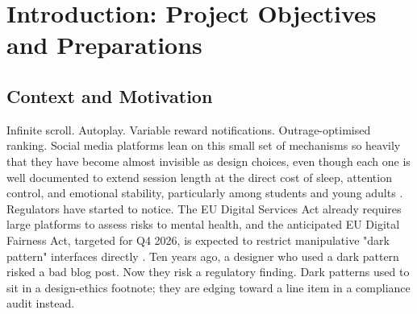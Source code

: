 \documentclass[11pt]{article}
\begin{document}
\clearpage
{}
\setcounter{page}{1}

\begin{abstract}
This project report documents the Stanford d.School design thinking process used to develop MindfulFeed, a pro-social social media application designed to replace engagement-maximising dark patterns with intentional, autonomy-preserving controls. Following the five sequential phases Empathize, Define, Ideate, Prototype, and Test, the project team conducted three semi-structured user interviews, synthesised an empathy map and a primary persona, framed a point-of-view statement and four How-Might-We questions, generated concepts through SCAMPER and a Desirability-Feasibility-Profitability matrix, and produced three progressively refined prototypes (low-, mid-, and high-fidelity) that were evaluated through cognitive walkthroughs and usability feedback. The resulting record traces concrete design decisions, such as symmetric opt-in/opt-out consent, tiered personalisation, and fatigue-aware nudges, back to specific user evidence and to the regulatory and behavioural-economics literature that framed the problem. A GenAI usage appendix discloses where generative AI tools assisted the project team.
\end{abstract}

\section{Introduction: Project Objectives and Preparations}

\subsection{Context and Motivation}
\label{sec:context_motivation}
Infinite scroll. Autoplay. Variable reward notifications. Outrage-optimised ranking. Social media platforms lean on this small set of mechanisms so heavily that they have become almost invisible as design choices, even though each one is well documented to extend session length at the direct cost of sleep, attention control, and emotional stability, particularly among students and young adults \parencites[11]{6644697}[6]{9300898}. Regulators have started to notice. The EU Digital Services Act already requires large platforms to assess risks to mental health, and the anticipated EU Digital Fairness Act, targeted for Q4 2026, is expected to restrict manipulative "dark pattern" interfaces directly \parencites[12]{4969503}. Ten years ago, a designer who used a dark pattern risked a bad blog post. Now they risk a regulatory finding. Dark patterns used to sit in a design-ethics footnote; they are edging toward a line item in a compliance audit instead.
\end{document}
